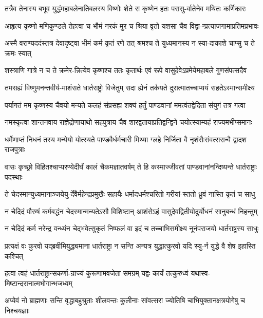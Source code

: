 \twolineshloka
{तत्रैव तेनास्य बभूव युद्धंमहाबलेनातिबलस्य विष्णोः}
{शेते स कृष्णेन हतः परासु-र्वातेनेव मथितः कर्णिकारः}


\twolineshloka
{आहृत्य कृष्णो मणिकुण्डले तेहत्वा च भौमं नरकं मुर च}
{श्रिया वृतो यशसा चैव विद्वा-न्प्रत्याजगामाप्रतिमप्रभावः}


\twolineshloka
{अस्मै वराण्यददंस्तत्र देवादृष्ट्वा भीमं कर्म कृतं रणे तत्}
{श्रमश्च ते युध्यमानस्य न स्या-दाकाशे चाप्सु च ते क्रमः स्यात्}


\twolineshloka
{शस्त्राणि गात्रे न च ते क्रमेर-न्नित्येव कृष्णश्च ततः कृतार्थः}
{एवं रूपे वासुदेवेऽप्रमेयेमहाबले गुणसंपत्सदैव}


\twolineshloka
{तमसह्यं विष्णुमनन्तवीर्य-माशंसते धार्तराष्ट्रो विजेतुम्}
{सदा ह्येनं तर्कयते दुरात्मातच्चाप्ययं सहतेऽस्मान्समीक्ष्य}


\twolineshloka
{पर्यागतं मम कृष्णस्य चैवयो मन्यते कलहं संप्रसह्य}
{शक्यं हर्तुं पाण्डवानां ममत्वंतद्वेदिता संयुगं तत्र गत्वा}


\twolineshloka
{नमस्कृत्वा शान्तनवाय राज्ञेद्रोणायाथो सहपुत्राय चैव}
{शारद्वतायाप्रतिद्वन्द्विने चयोत्स्याम्यहं राज्यमभीप्समानः}


\twolineshloka
{धर्मेणाप्तं निधनं तस्य मन्येयो योत्स्यते पाण्डवैर्धर्मचारी}
{मिथ्या ग्लहे निर्जिता वै नृशंसैःसंवत्सरान्वै द्वादश राजपुत्राः}


\twolineshloka
{वासः कृच्छ्रो विहितश्चाप्यरण्येदीर्घं कालं चैकमज्ञातवर्षम्}
{ते हि कस्माज्जीवतां पाण्डवानांनन्दिष्यन्ते धार्तराष्ट्राः पदस्थाः}


\twolineshloka
{ते चेदस्मान्युध्यमानाञ्जयेयु-र्देवैर्महेन्द्रप्रमुखैः सहायैः}
{धर्मादधर्मश्चरितो गरीयां-स्ततो ध्रुवं नास्ति कृतं च साधु}


\twolineshloka
{न चेदिदं पौरुषं कर्मबद्धंन चेदस्मान्मन्यतेऽसौ विशिष्टान्}
{आशंसेऽहं वासुदेवद्वितीयोदुर्योधनं सानुबन्धं निहन्तुम्}


\twolineshloka
{न चेदिदं कर्म नरेन्द्र वन्ध्यंन चेद्भवेत्सुकृतं निष्फलं वा}
{इदं च तच्चाभिसमीक्ष्य नूनंपराजयो धार्तराष्ट्रस्य साधुः}


\twolineshloka
{प्रत्यक्षं वः कुरवो यद्ब्रवीमियुद्ध्यमाना धार्तराष्ट्रा न सन्ति}
{अन्यत्र युद्धात्कुरवो यदि स्यु-र्न युद्धे वै शेष इहास्ति कश्चित्}


\twolineshloka
{हत्वा त्वहं धार्तराष्ट्रान्सकर्णा-न्राज्यं कुरूणामवजेता समग्रम्}
{यद्वः कार्यं तत्कुरुध्वं यथास्व-मिष्टान्दरानात्मभोगान्भजध्वम्}


\twolineshloka
{अप्येवं नो ब्राह्मणाः सन्ति वृद्धाबहुश्रुताः शीलवन्तः कुलीनाः}
{सांवत्सरा ज्योतिषि चाभियुक्तानक्षत्रयोगेषु च निश्चयज्ञाः}


